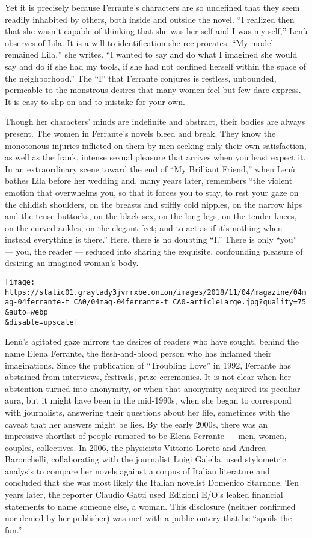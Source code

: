 Yet it is precisely because Ferrante's characters are so undefined that
they seem readily inhabited by others, both inside and outside the
novel. ``I realized then that she wasn't capable of thinking that she
was her self and I was my self,'' Lenù observes of Lila. It is a will to
identification she reciprocates. ``My model remained Lila,'' she writes.
``I wanted to say and do what I imagined she would say and do if she had
my tools, if she had not confined herself within the space of the
neighborhood.'' The ``I'' that Ferrante conjures is restless, unbounded,
permeable to the monstrous desires that many women feel but few dare
express. It is easy to slip on and to mistake for your own.

Though her characters' minds are indefinite and abstract, their bodies
are always present. The women in Ferrante's novels bleed and break. They
know the monotonous injuries inflicted on them by men seeking only their
own satisfaction, as well as the frank, intense sexual pleasure that
arrives when you least expect it. In an extraordinary scene toward the
end of ``My Brilliant Friend,'' when Lenù bathes Lila before her wedding
and, many years later, remembers ``the violent emotion that overwhelms
you, so that it forces you to stay, to rest your gaze on the childish
shoulders, on the breasts and stiffly cold nipples, on the narrow hips
and the tense buttocks, on the black sex, on the long legs, on the
tender knees, on the curved ankles, on the elegant feet; and to act as
if it's nothing when instead everything is there.'' Here, there is no
doubting ``I.'' There is only ``you'' --- you, the reader --- seduced
into sharing the exquisite, confounding pleasure of desiring an imagined
woman's body.

\texttt{[image: https://static01.graylady3jvrrxbe.onion/images/2018/11/04/magazine/04mag-04ferrante-t\_CA0/04mag-04ferrante-t\_CA0-articleLarge.jpg?quality=75\\\&auto=webp\\\&disable=upscale]}

Lenù's agitated gaze mirrors the desires of readers who have sought,
behind the name Elena Ferrante, the flesh-and-blood person who has
inflamed their imaginations. Since the publication of ``Troubling Love''
in 1992, Ferrante has abstained from interviews, festivals, prize
ceremonies. It is not clear when her abstention turned into anonymity,
or when that anonymity acquired its peculiar aura, but it might have
been in the mid-1990s, when she began to correspond with journalists,
answering their questions about her life, sometimes with the caveat that
her answers might be lies. By the early 2000s, there was an impressive
shortlist of people rumored to be Elena Ferrante --- men, women,
couples, collectives. In 2006, the physicists Vittorio Loreto and Andrea
Baronchelli, collaborating with the journalist Luigi Galella, used
stylometric analysis to compare her novels against a corpus of Italian
literature and concluded that she was most likely the Italian novelist
Domenico Starnone. Ten years later, the reporter Claudio Gatti used
Edizioni E/O's leaked financial statements to name someone else, a
woman. This disclosure (neither confirmed nor denied by her publisher)
was met with a public outcry that he ``spoils the fun.''


